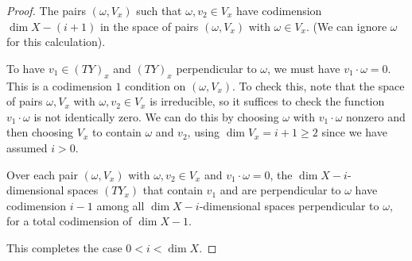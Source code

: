 \documentclass[12pt]{amsart}
\theoremstyle{definition}
\theoremstyle{remark}
\newcommand{\inhyper}[1] {\tilde{#1}}
\begin{document}
\begin{proof}



The pairs  $(\omega,  V_x)$ such that $\omega, v_2 \in V_x$ have codimension $\dim X - (i+1)$ in the space of pairs $(\omega, V_x)$ with $ \omega \in V_x$. (We can ignore $\omega$ for this calculation).

To have $v_1 \in (TY)_x$ and $(TY)_x$ perpendicular to $\omega$, we must have $v_1 \cdot \omega =0$. This is a codimension $1$ condition on $(\omega, V_x)$. To check this, note that the space of pairs $\omega, V_x$ with  $\omega, v_2 \in V_x$ is irreducible, so it suffices to check the function $v_1 \cdot \omega$ is not identically zero. We can do this by choosing $\omega$ with $v_1 \cdot \omega$ nonzero and then choosing $V_x$ to contain $\omega$ and $v_2$, using $\dim V_x= i+1 \geq 2$ since we have assumed $i>0$. 


Over each pair $(\omega, V_x)$ with  $\omega, v_2 \in V_x$ and $v_1 \cdot \omega = 0$,  the $\dim X-i$-dimensional spaces $(TY_x)$ that contain $v_1$ and are perpendicular to $\omega$ have codimension $i-1$ among all $\dim X-i$-dimensional spaces perpendicular to $\omega$, for a total codimension of $\dim X - 1$.

This completes the case $0 < i < \dim X$.


 


%


\end{proof}
\end{document}
